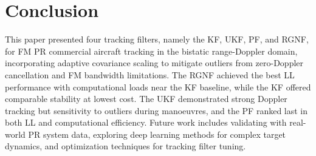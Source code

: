 \documentclass[conference,10pt,a4paper]{IEEEtran}%
\begin{document}
\section{Conclusion}

This paper presented four tracking filters, namely the KF, UKF, PF, and RGNF, for FM PR commercial aircraft tracking in the bistatic range-Doppler domain, incorporating adaptive covariance scaling to mitigate outliers from zero-Doppler cancellation and FM bandwidth limitations. The RGNF achieved the best LL performance with computational loads near the KF baseline, while the KF offered comparable stability at lowest cost. The UKF demonstrated strong Doppler tracking but sensitivity to outliers during manoeuvres, and the PF ranked last in both LL and computational efficiency. Future work includes validating with real-world PR system data, exploring deep learning methods for complex target dynamics, and optimization techniques for tracking filter tuning.






\end{document}
